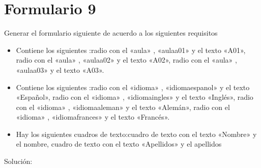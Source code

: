 \documentclass[letterpaper,10pt,spanish]{sphinxmanual}
\begin{document}
\section{Formulario 9}
\label{\detokenize{ejercicios/formularios/anexo_formularios:formulario-9}}
Generar el formulario siguiente de acuerdo a los siguientes requisitos
\begin{itemize}
\item {} 
Contiene los siguientes :radio con el   «aula» ,   «aulaa01»  y el texto «A01», radio con el   «aula» ,   «aulaa02»  y el texto «A02», radio con el   «aula» ,   «aulaa03»  y el texto «A03».

\item {} 
Contiene los siguientes :radio con el   «idioma» ,   «idiomaespanol»  y el texto «Español», radio con el   «idioma» ,   «idiomaingles»  y el texto «Inglés», radio con el   «idioma» ,   «idiomaaleman»  y el texto «Alemán», radio con el   «idioma» ,   «idiomafrances»  y el texto «Francés».

\item {} 
Hay los siguientes cuadros de texto:cuadro de texto con el texto «Nombre» y el  nombre, cuadro de texto con el texto «Apellidos» y el  apellidos

\end{itemize}


Solución:
\end{document}
